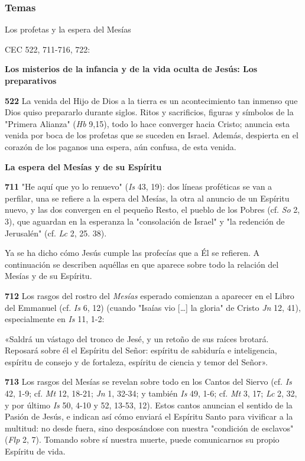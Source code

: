 \documentclass[]{article}
\begin{document}
\protect\hypertarget{_Toc448662732}{}{\protect\hypertarget{_Toc448690251}{}{}}

\subsubsection{Temas}\label{temas-1}

Los profetas y la espera del Mesías

CEC 522, 711-716, 722:

\textbf{Los misterios de la infancia y de la vida oculta de Jesús: Los
preparativos}

\textbf{522} La venida del Hijo de Dios a la tierra es un acontecimiento
tan inmenso que Dios quiso prepararlo durante siglos. Ritos y
sacrificios, figuras y símbolos de la "Primera Alianza" (\emph{Hb}
9,15), todo lo hace converger hacia Cristo; anuncia esta venida por boca
de los profetas que se suceden en Israel. Además, despierta en el
corazón de los paganos una espera, aún confusa, de esta venida.

\textbf{La espera del Mesías y de su Espíritu}

\textbf{711} "He aquí que yo lo renuevo" (\emph{Is} 43, 19): dos líneas
proféticas se van a perfilar, una se refiere a la espera del Mesías, la
otra al anuncio de un Espíritu nuevo, y las dos convergen en el pequeño
Resto, el pueblo de los Pobres (cf. \emph{So} 2, 3), que aguardan en la
esperanza la "consolación de Israel" y "la redención de Jerusalén" (cf.
\emph{Lc} 2, 25. 38).

Ya se ha dicho cómo Jesús cumple las profecías que a Él se refieren. A
continuación se describen aquéllas en que aparece sobre todo la relación
del Mesías y de su Espíritu.

\textbf{712} Los rasgos del rostro del \emph{Mesías} esperado comienzan
a aparecer en el Libro del Emmanuel (cf. \emph{Is} 6, 12) (cuando
"Isaías vio [\ldots{}] la gloria" de Cristo \emph{Jn} 12, 41),
especialmente en \emph{Is} 11, 1-2:

«Saldrá un vástago del tronco de Jesé, y un retoño de sus raíces
brotará. Reposará sobre él el Espíritu del Señor: espíritu de sabiduría
e inteligencia, espíritu de consejo y de fortaleza, espíritu de ciencia
y temor del Señor».

\textbf{713} Los rasgos del Mesías se revelan sobre todo en los Cantos
del Siervo (cf. \emph{Is} 42, 1-9; cf. \emph{Mt} 12, 18-21; \emph{Jn} 1,
32-34; y también \emph{Is} 49, 1-6; cf. \emph{Mt} 3, 17; \emph{Lc} 2,
32, y por último \emph{Is} 50, 4-10 y 52, 13-53, 12). Estos cantos
anuncian el sentido de la Pasión de Jesús, e indican así cómo enviará el
Espíritu Santo para vivificar a la multitud: no desde fuera, sino
desposándose con nuestra "condición de esclavos" (\emph{Flp} 2, 7).
Tomando sobre sí nuestra muerte, puede comunicarnos su propio Espíritu
de vida.
\end{document}
